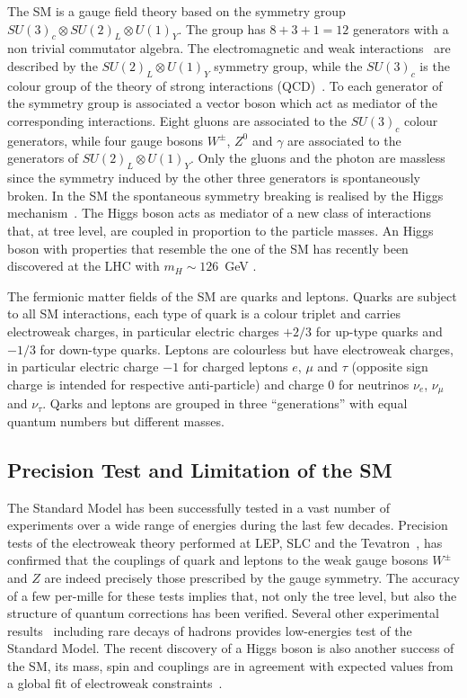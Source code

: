 The SM is a gauge field theory based on the symmetry group $SU(3)_c \otimes SU(2)_L \otimes U(1)_Y$. The group has $8+3+1=12$
generators with a non trivial commutator algebra. The electromagnetic and weak interactions~\cite{EW1,EW2,EW3}  are described  by the 
$SU(2)_L \otimes U(1)_Y$ symmetry group, while the $ SU(3)_c$ is the colour group of the theory of strong interactions (QCD)~\cite{qcd1}.
To each generator of the symmetry group is associated a vector boson which act as mediator of the corresponding interactions.
Eight gluons are associated to the $ SU(3)_c$ colour generators, while  four gauge bosons $W^{\pm}$,
$Z^0$ and $\gamma$ are associated to the generators of $SU(2)_L \otimes U(1)_Y$. 
Only the gluons and the photon are massless since the symmetry induced by the other three generators is
spontaneously broken. In the SM the spontaneous symmetry breaking is realised by the Higgs mechanism~\cite{ENGLERT,HIGGS,HIGGS2,HIGGS3,kibble}.
The Higgs boson acts as mediator of a new class of interactions that, at tree level, are coupled in proportion to the particle masses.
An Higgs boson with properties that resemble the one of the SM 
has recently been discovered at the LHC with $m_H \sim 126$~GeV \cite{AHiggsO,CHiggsO}. %

The fermionic matter fields of the SM are quarks and leptons. 
Quarks  are subject to all SM interactions, each type of quark is a colour triplet and carries 
electroweak charges, in particular electric charges $+2/3$ for up-type quarks and $-1/3$
for down-type quarks.  Leptons are colourless
but have electroweak charges, in particular electric charge $-1$ for charged leptons $e$, $\mu$ and $\tau$ (opposite sign charge 
is intended for respective anti-particle)  and charge 0 for neutrinos $\nu_e$, $\nu_{\mu}$ and $\nu_{\tau}$.
Qarks and leptons are grouped in three  ``generations'' with equal quantum numbers but different masses.


\subsection{Precision Test and Limitation of the SM}

The Standard Model has been successfully tested in a vast number of experiments over a wide range of energies during the last few decades.
Precision tests of the electroweak theory performed at LEP, SLC and the Tevatron~\cite{smtest}, 
has confirmed that the couplings of quark and leptons to the weak gauge bosons $W^{\pm}$  and $Z$ are indeed
precisely those prescribed by the gauge symmetry. The accuracy of a few per-mille for these
tests implies that, not only the tree level, but also the structure of quantum corrections has
been verified. Several other experimental results~\cite{pdg}
including rare decays of hadrons provides low-energies test of the Standard Model. 
The recent discovery of a Higgs boson  is also another success of the SM, its mass, spin and couplings 
are in agreement with expected values from a global fit of electroweak constraints~\cite{gfitter}.

